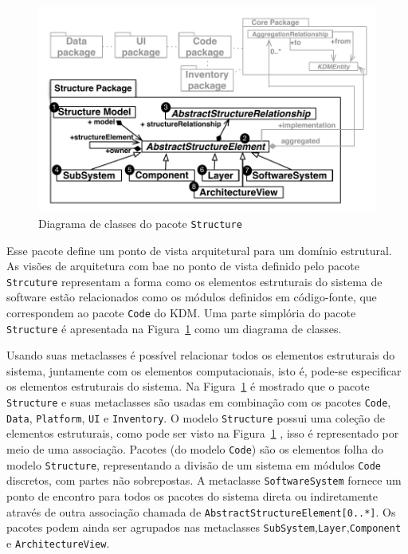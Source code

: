 \begin{figure}[h]
	\centering
	\caption{Diagrama de classes do pacote \texttt{Structure}\label{fig:structureModel}}
	\includegraphics[scale=0.7]{images/StructurePackageFigure}
\end{figure}

Esse pacote define um ponto de vista arquitetural para um domínio estrutural. As visões de arquitetura com bae no ponto de vista definido pelo pacote \texttt{Strcuture} representam a forma como os elementos estruturais do sistema de software estão relacionados como os módulos definidos em código-fonte, que correspondem ao pacote \texttt{Code} do KDM. Uma parte simplória do pacote \texttt{Structure} é apresentada na Figura~\ref{fig:structureModel} como um diagrama de classes.

 Usando suas metaclasses é possível relacionar todos os elementos estruturais do sistema, juntamente com os elementos computacionais, isto é, pode-se especificar os elementos estruturais do sistema. Na Figura~\ref{fig:structureModel} é mostrado que o pacote \texttt{Structure} e suas metaclasses são usadas em combinação com os pacotes \texttt{Code}, \texttt{Data}, \texttt{Platform}, \texttt{UI} e \texttt{Inventory}. O modelo \texttt{Structure} possui uma coleção de elementos estruturais, como pode ser visto na Figura~\ref{fig:structureModel} , isso é representado por meio de uma associação. Pacotes (do modelo \texttt{Code}) são os elementos folha do modelo \texttt{Structure}, representando a divisão de um sistema em módulos \texttt{Code} discretos, com partes não sobrepostas. A metaclasse \texttt{SoftwareSystem} fornece um ponto de encontro para todos os pacotes do sistema direta ou indiretamente através de outra associação chamada de \texttt{AbstractStructureElement[0..*]}. Os pacotes podem ainda ser agrupados nas metaclasses \texttt{SubSystem},\texttt{Layer},\texttt{Component} e \texttt{ArchitectureView}. 
 
